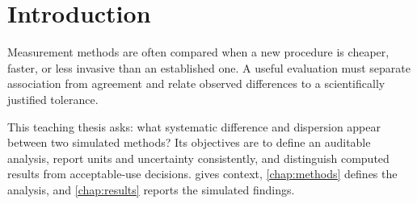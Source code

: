 \chapter{Introduction}
\label{chap:introduction}

Measurement methods are often compared when a new procedure is cheaper,
faster, or less invasive than an established one. A useful evaluation must
separate association from agreement and relate observed differences to a
scientifically justified tolerance.

This teaching thesis asks: what systematic difference and dispersion appear
between two simulated methods? Its objectives are to define an auditable
analysis, report units and uncertainty consistently, and distinguish computed
results from acceptable-use decisions.  gives context,
\cref{chap:methods} defines the analysis, and \cref{chap:results} reports the
simulated findings.
